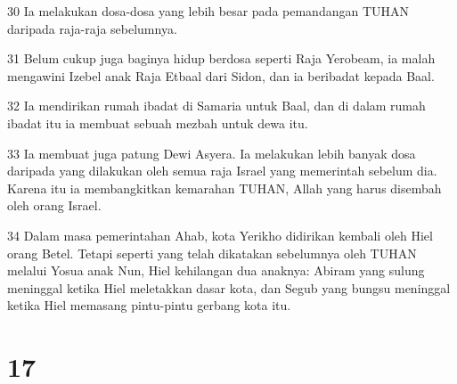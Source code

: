 \par 30 Ia melakukan dosa-dosa yang lebih besar pada pemandangan TUHAN daripada raja-raja sebelumnya.
\par 31 Belum cukup juga baginya hidup berdosa seperti Raja Yerobeam, ia malah mengawini Izebel anak Raja Etbaal dari Sidon, dan ia beribadat kepada Baal.
\par 32 Ia mendirikan rumah ibadat di Samaria untuk Baal, dan di dalam rumah ibadat itu ia membuat sebuah mezbah untuk dewa itu.
\par 33 Ia membuat juga patung Dewi Asyera. Ia melakukan lebih banyak dosa daripada yang dilakukan oleh semua raja Israel yang memerintah sebelum dia. Karena itu ia membangkitkan kemarahan TUHAN, Allah yang harus disembah oleh orang Israel.
\par 34 Dalam masa pemerintahan Ahab, kota Yerikho didirikan kembali oleh Hiel orang Betel. Tetapi seperti yang telah dikatakan sebelumnya oleh TUHAN melalui Yosua anak Nun, Hiel kehilangan dua anaknya: Abiram yang sulung meninggal ketika Hiel meletakkan dasar kota, dan Segub yang bungsu meninggal ketika Hiel memasang pintu-pintu gerbang kota itu.

\chapter{17}

